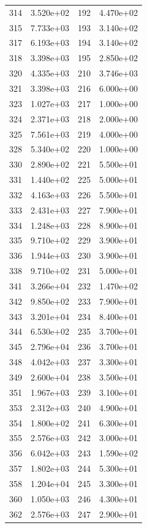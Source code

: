 \documentclass[12pt]{article}
\begin{document}
\begin{longtable}{@{}cccc@{}}
314 & 3.520e+02 & 192 & 4.470e+02 \\
315 & 7.733e+03 & 193 & 3.140e+02 \\
317 & 6.193e+03 & 194 & 3.140e+02 \\
318 & 3.398e+03 & 195 & 2.850e+02 \\
320 & 4.335e+03 & 210 & 3.746e+03 \\
321 & 3.398e+03 & 216 & 6.000e+00 \\
323 & 1.027e+03 & 217 & 1.000e+00 \\
324 & 2.371e+03 & 218 & 2.000e+00 \\
325 & 7.561e+03 & 219 & 4.000e+00 \\
328 & 5.340e+02 & 220 & 1.000e+00 \\
330 & 2.890e+02 & 221 & 5.500e+01 \\
331 & 1.440e+02 & 225 & 5.000e+01 \\
332 & 4.163e+03 & 226 & 5.500e+01 \\
333 & 2.431e+03 & 227 & 7.900e+01 \\
334 & 1.248e+03 & 228 & 8.900e+01 \\
335 & 9.710e+02 & 229 & 3.900e+01 \\
336 & 1.944e+03 & 230 & 3.900e+01 \\
338 & 9.710e+02 & 231 & 5.000e+01 \\
341 & 3.266e+04 & 232 & 1.470e+02 \\
342 & 9.850e+02 & 233 & 7.900e+01 \\
343 & 3.201e+04 & 234 & 8.400e+01 \\
344 & 6.530e+02 & 235 & 3.700e+01 \\
345 & 2.796e+04 & 236 & 3.700e+01 \\
348 & 4.042e+03 & 237 & 3.300e+01 \\
349 & 2.600e+04 & 238 & 3.500e+01 \\
351 & 1.967e+03 & 239 & 3.100e+01 \\
353 & 2.312e+03 & 240 & 4.900e+01 \\
354 & 1.800e+02 & 241 & 6.300e+01 \\
355 & 2.576e+03 & 242 & 3.000e+01 \\
356 & 6.042e+03 & 243 & 1.590e+02 \\
357 & 1.802e+03 & 244 & 5.300e+01 \\
358 & 1.204e+04 & 245 & 3.300e+01 \\
360 & 1.050e+03 & 246 & 4.300e+01 \\
362 & 2.576e+03 & 247 & 2.900e+01 \\

\end{longtable}
\end{document}
